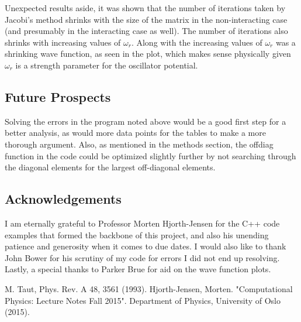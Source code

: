 \documentclass[10pt,showpacs,preprintnumbers,footinbib,amsmath,amssymb,aps,prl,twocolumn,groupedaddress,superscriptaddress,showkeys]{revtex4-1}
\begin{document}
Unexpected results aside, it was shown that the number of iterations taken by Jacobi's method shrinks with the size of the matrix in the non-interacting case (and presumably in the interacting case as well). The number of iterations also shrinks with increasing values of $\omega_{r}$. Along with the increasing values of $\omega_{r}$ was a shrinking wave function, as seen in the plot, which makes sense physically given $\omega_{r}$ is a strength parameter for the oscillator potential.

	\subsection{Future Prospects}
	Solving the errors in the program noted above would be a good first step for a better analysis, as would more data points for the tables to make a more thorough argument. Also, as mentioned in the methods section, the offdiag function in the code could be optimized slightly further by not searching through the diagonal elements for the largest off-diagonal elements.

        \subsection{Acknowledgements}
        I am eternally grateful to Professor Morten Hjorth-Jensen for the C++ code examples that formed the backbone of this project, and also his unending patience and generosity when it comes to due dates. I would also like to thank John Bower for his scrutiny of my code for errors I did not end up resolving. Lastly, a special thanks to Parker Brue for aid on the wave function plots.

\begin{thebibliography}{9}
M. Taut, Phys. Rev. A 48, 3561 (1993).
Hjorth-Jensen, Morten. "Computational Physics: Lecture Notes Fall 2015". Department of Physics, University of Oslo (2015).
\end{thebibliography}
\end{document}
